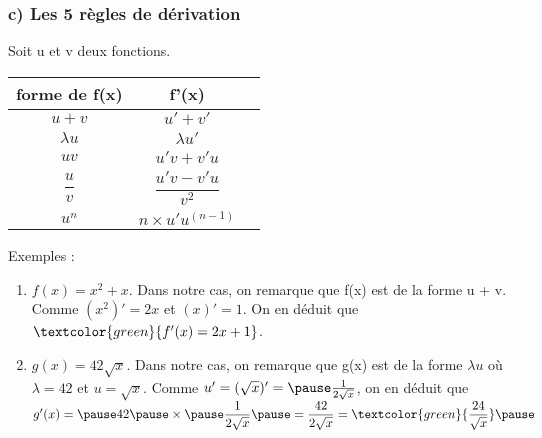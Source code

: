 \documentclass[t]{beamer}
\begin{document}
\begin{frame}[label=pagebanale]
\frametitle{c) Les 5 règles de dérivation}
\pause
Soit u et v deux fonctions.
\begin{tabular}{|c|c|c|}
	\hline
		\textbf{forme de f(x)} & \textbf{f'(x)} \\
	\hline
		$u+v$ & $u' + v'$ \\
	\hline
		$\lambda u$ & $\lambda u'$ \\
	\hline
		$uv $ & $u'v +v'u$ \\
	\hline 
		$\dfrac{u}{v}$ & $\dfrac{u'v-v'u}{v^2}$ \\
	\hline
		$u^n$ & $n \times u' u^{(n-1)}$ \\
	\hline
\end{tabular} 
\pause
\begin{block}{Exemples :}
	\begin{enumerate}
		\pause
		\item $f(x) = x^2 + x$. \pause Dans notre cas, on remarque que f(x) est de la forme u + v. \pause Comme $(x^2)' = 2x$ \pause et $(x)' = 1$. \pause On en déduit que $\textcolor{green}{f'(x) = 2x + 1}$. \pause
		\item $g(x) = 42 \sqrt{x}$. \pause Dans notre cas, on remarque que g(x) est de la forme $\lambda u$ \pause où $\lambda = 42$ \pause et $u = \sqrt{x}$. \pause Comme $u' = (\sqrt{x})' = \pause \frac{1}{2\sqrt{x}}$, \pause on en déduit que $g'(x) = \pause 42 \pause \times \pause \dfrac{1}{2\sqrt{x}} \pause = \dfrac{42}{2\sqrt{x}} = \textcolor{green}{\dfrac{24}{\sqrt{x}}} \pause $
	\end{enumerate}
\end{block}
\end{frame}
\end{document}
